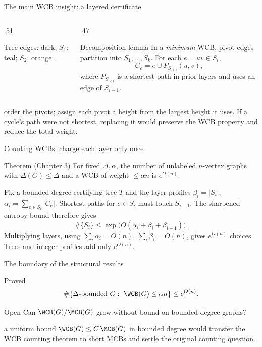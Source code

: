 \begin{frame}{The main WCB insight: a layered certificate}
 \begin{columns}[c,onlytextwidth]
  \begin{column}{.51\textwidth}
   \centering\resizebox{\linewidth}{!}{\WCBLayersFig}\par\scriptsize Tree edges: dark; $S_1$: teal; $S_2$: orange.
  \end{column}
  \begin{column}{.47\textwidth}
   \begin{block}{Decomposition lemma}
   In a \emph{minimum} WCB, pivot edges partition into $S_1,\dots,S_k$.
   For each $e=uv\in S_i$,
   \[C_e=e\cup P_{S_{<i}}(u,v),\]
   where $P_{S_{<i}}$ is a shortest path in prior layers and uses an edge of $S_{i-1}$.
   \end{block}
  \end{column}
 \end{columns}
 \small{} order the pivots; assign each pivot a height from the largest height it uses. If a cycle's path were not shortest, replacing it would preserve the WCB property and reduce the total weight.
\end{frame}


\begin{frame}{Counting WCBs: charge each layer only once}
 \begin{block}{Theorem (Chapter 3)}
 For fixed $\Delta,\alpha$, the number of unlabeled $n$-vertex graphs with $\Delta(G)\le\Delta$ and a WCB of weight $\le\alpha n$ is $e^{O(n)}$.
 \end{block}
  Fix a bounded-degree certifying tree $T$ and the layer profiles $\beta_i=|S_i|$, $\alpha_i=\sum_{e\in S_i}|C_e|$.
 \vspace{.08cm}
  Shortest paths for $e\in S_i$ must touch $S_{i-1}$. The sharpened entropy bound therefore gives
 \[\#\{S_i\}\le\exp\bigl(O(\alpha_i+\beta_i+\beta_{i-1})\bigr).\]
  Multiplying layers, using $\sum_i\alpha_i=O(n)$, $\sum_i\beta_i=O(n)$, gives $e^{O(n)}$ choices. Trees and integer profiles add only $e^{O(n)}$.
\end{frame}


\begin{frame}{The boundary of the structural results}
 \begin{block}{Proved}
 \[\#\{\Delta\text{-bounded }G:\ \WCB(G)\le\alpha n\}\le e^{O(n)}.\]
 \end{block}
 \begin{block}{Open}
 Can $\WCB(G)/\MCB(G)$ grow without bound on bounded-degree graphs?
 \end{block}
 \vspace{.25cm}
  a uniform bound $\WCB(G)\le C\,\MCB(G)$ in bounded degree would transfer the WCB counting theorem to short MCBs and settle the original counting question.
\end{frame}


